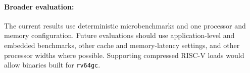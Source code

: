 \paragraph{Broader evaluation:} The current results use deterministic
microbenchmarks and one processor and memory configuration. Future
evaluations should use application-level and embedded benchmarks,
other cache and memory-latency settings, and other processor widths
where possible. Supporting compressed RISC-V loads would allow
binaries built for \texttt{rv64gc}.
